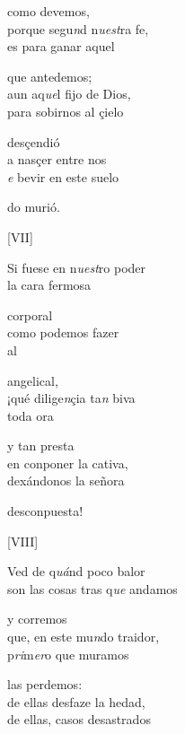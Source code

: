 \documentclass[11pt,a4paper,twoside]{article}
\begin{document}
{como devemos,\\
porque segu\textit{n}d n\textit{uest}ra fe,\\
es para ganar aquel

que antedemos;\\
 aun aq\textit{ue}l fijo de Dios,\\
para sobirnos al çielo

desçendió\\
a nasçer  entre nos\\
\textit{e} bevir en este suelo

do murió.
\pend

\begin{center}
	[VII]
\end{center}
\pstart
Si fuese en n\textit{uest}ro poder\\
 la cara fermosa

corporal\\
como podemos fazer\\ al  

angelical,\\
¡qué dilige\textit{n}çia ta\textit{n} biva\\
 toda ora

y tan presta\\
en conponer la cativa,\\
dexándonos la señora

desconpuesta!
\pend

\begin{center}
	[VIII]
\end{center}
\pstart
Ved de q\textit{uá}nd poco balor\\
son las cosas tras q\textit{ue} andamos

y corremos\\
que, en este mu\textit{n}do traidor,\\
 p\textit{ri}m\textit{er}o que muramos

las perdemos:\\
de ellas desfaze la hedad,\\
de ellas, casos desastrados

}
\end{document}
